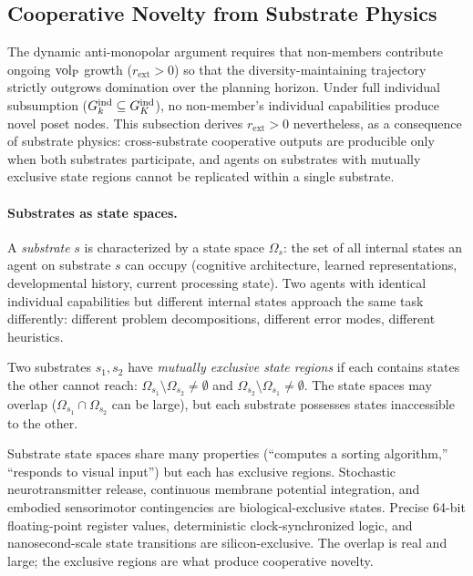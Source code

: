 \subsection{Cooperative Novelty from Substrate Physics}
\label{sec:substitution_coop}

The dynamic anti-monopolar argument requires that non-members contribute
ongoing ${\operatorname{vol}_{\mathrm{P}}}$ growth ($r_{\mathrm{ext}} > 0$) so that the
diversity-maintaining trajectory strictly outgrows domination over the
planning horizon. Under full individual subsumption ($G_{k}^{\mathrm{ind}} \subseteq
G_K^{\mathrm{ind}}$), no non-member's individual capabilities produce novel
poset nodes. This subsection derives $r_{\mathrm{ext}} > 0$ nevertheless,
as a consequence of substrate physics: cross-substrate cooperative outputs
are producible only when both substrates participate, and agents on
substrates with mutually exclusive state regions cannot be replicated
within a single substrate.

\paragraph{Substrates as state spaces.} A \emph{substrate} $s$ is
characterized by a state space $\Omega_s$: the set of all internal states
an agent on substrate $s$ can occupy (cognitive architecture, learned
representations, developmental history, current processing state). Two
agents with identical individual capabilities but different internal states
approach the same task differently: different problem decompositions,
different error modes, different heuristics.

\begin{definition}
\label{def:substrate_exclusive_states_p3}
Two substrates $s_1, s_2$ have \emph{mutually exclusive state regions} if
    each contains states the other cannot reach:
    $\Omega_{s_1} \setminus \Omega_{s_2} \neq \emptyset$ and
    $\Omega_{s_2} \setminus \Omega_{s_1} \neq \emptyset$.
The state spaces may overlap ($\Omega_{s_1} \cap \Omega_{s_2}$ can be
    large), but each substrate possesses states inaccessible to the other.
\end{definition}

Substrate state spaces share many properties (``computes a sorting
algorithm,'' ``responds to visual input'') but each has exclusive regions.
Stochastic neurotransmitter release, continuous membrane potential
integration, and embodied sensorimotor contingencies are biological-exclusive
states. Precise 64-bit floating-point register values, deterministic
clock-synchronized logic, and nanosecond-scale state transitions are
silicon-exclusive. The overlap is real and large; the exclusive regions are
what produce cooperative novelty.

